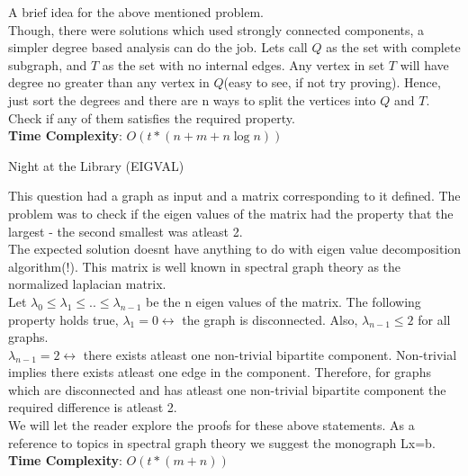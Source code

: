 \documentclass[solution,addpoints,12pt]{exam}
\begin{document}
\begin{questions}
\begin{solution}
  A brief idea for the above mentioned problem. \\
  Though, there were solutions which used strongly connected components, a simpler degree based analysis can do the job. Lets call $Q$ as the set with
  complete subgraph, and $T$ as the set with no internal edges. Any vertex in set $T$ will have degree no greater than any vertex in $Q$(easy to see, if not
  try proving). Hence, just sort the degrees and there are n ways to split the vertices into $Q$ and $T$. Check if any of them satisfies the required property.\\
  
  \textbf{Time Complexity}: $O(t \ast (n + m+ n \log n))$ \\
  
\end{solution}

\question
  Night at the Library (EIGVAL)

\begin{solution}
  This question had a graph as input and a matrix corresponding to it defined. The problem was to check if the eigen values of the 
  matrix had the property that the largest - the second smallest was atleast 2. \\
  
  The expected solution doesnt have anything to do with eigen value decomposition algorithm(!). This matrix is well known in spectral graph theory
  as the normalized laplacian matrix. \\
  
  Let $\lambda_0 \leq \lambda_1 \leq  ..  \leq \lambda_{n-1}$ be the n eigen values of the matrix. The following property holds true,
  $\lambda_1 = 0 \leftrightarrow$ the graph is disconnected. Also, $\lambda_{n-1} \leq 2$ for all graphs. \\
  $\lambda_{n-1} = 2 \leftrightarrow$ there exists atleast one non-trivial bipartite component. Non-trivial implies there exists atleast one edge in the
  component. Therefore, for graphs which are disconnected and has atleast one non-trivial bipartite component the required difference is atleast 2.\\
  
  We will let the reader explore the proofs for these above statements. As a reference to topics in spectral graph theory we suggest the monograph
  Lx=b. \\
  
  \textbf{Time Complexity}: $O(t \ast (m+n))$ \\
 

\end{solution}
\end{questions}
\end{document}
